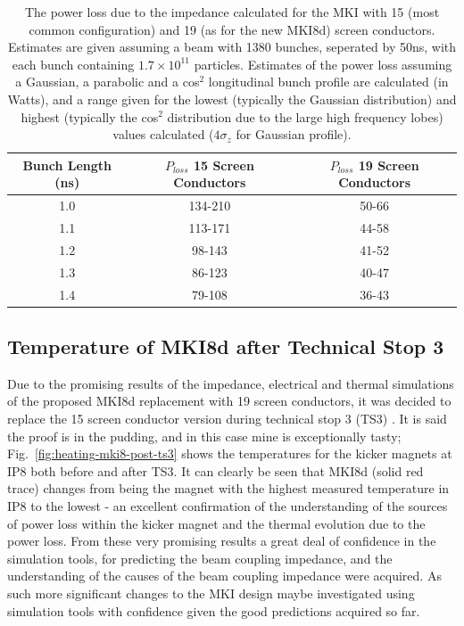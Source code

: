 \begin{table}
\caption{The power loss due to the impedance calculated for the MKI with 15 (most common configuration) and 19 (as for the new MKI8d) screen conductors. Estimates are given assuming a beam with 1380 bunches, seperated by 50ns, with each bunch containing $1.7 \times 10^{11}$ particles. Estimates of the power loss assuming a Gaussian, a parabolic and a cos$^{2}$ longitudinal bunch profile are calculated (in Watts), and a range given for the lowest (typically the Gaussian distribution) and highest (typically the cos$^{2}$ distribution due to the large high frequency lobes) values calculated  ($4\sigma_{z}$ for Gaussian profile).}
\label{tab:heating-15-19-cond}
\begin{center}
\begin{tabular}{c | c | c}
Bunch Length (ns) & $P_{loss}$ 15 Screen Conductors & $P_{loss}$ 19 Screen Conductors \\ \hline
1.0 &  134-210 & 50-66 \\ \hline
1.1 &  113-171 & 44-58 \\ \hline
1.2 &  98-143 & 41-52 \\ \hline
1.3 &  86-123 & 40-47 \\ \hline
1.4 &  79-108 & 36-43 \\ \hline
\end{tabular}
\end{center}
\end{table}

\subsection{Temperature of MKI8d after Technical Stop 3}

Due to the promising results of the impedance, electrical and thermal simulations of the proposed MKI8d replacement with 19 screen conductors, it was decided to replace the 15 screen conductor version during technical stop 3 (TS3) \cite{Barnes:emisMKITemp}. It is said the proof is in the pudding, and in this case mine is exceptionally tasty; Fig.~\ref{fig:heating-mki8-post-ts3} shows the temperatures for the kicker magnets at IP8 both before and after TS3. It can clearly be seen that MKI8d (solid red trace) changes from being the magnet with the highest measured temperature in IP8 to the lowest - an excellent confirmation of the understanding of the sources of power loss within the kicker magnet and the thermal evolution due to the power loss. From these very promising results a great deal of confidence in the simulation tools, for predicting the beam coupling impedance, and the understanding of the causes of the beam coupling impedance were acquired. As such more significant changes to the MKI design maybe investigated using simulation tools with confidence given the good predictions acquired so far.

